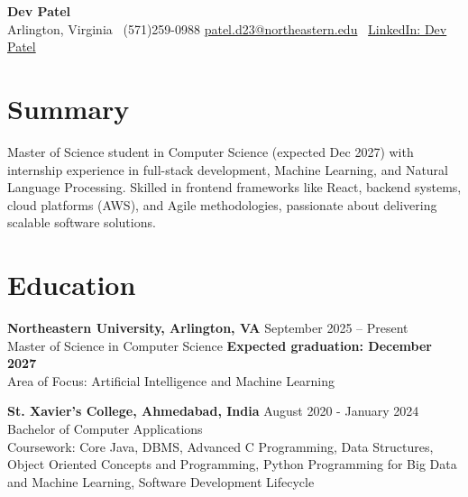 \documentclass[a4paper,10pt]{article}
\begin{document}
\begin{center}
\vspace{-3mm}
    \fontsize{16}{18}\selectfont \textbf{Dev Patel} \\
    \vspace{0mm}
    \normalsize Arlington, Virginia \textbar\ (571)259-0988  \textbar       \href{mailto:patel.d23@northeastern.edu}{patel.d23@northeastern.edu} \textbar\ \href{https://www.linkedin.com/in/devxpatel//}{LinkedIn: Dev Patel} \\
\end{center}



\section*{Summary}
Master of Science student in Computer Science (expected Dec 2027) with internship experience in full-stack development, Machine Learning, and Natural Language Processing. Skilled in frontend frameworks like React, backend systems, cloud platforms (AWS), and Agile methodologies, passionate about delivering scalable software solutions.
 
\vspace{ 0 mm}
\section*{Education}
\textbf{Northeastern University, Arlington, VA} \hfill September 2025 -- Present\\
Master of Science in Computer Science \hfill \textbf{Expected graduation: December 2027} \\
Area of Focus: Artificial Intelligence and Machine Learning

\vspace{1 mm} %
\textbf{St. Xavier's College, Ahmedabad, India} \hfill August 2020 - January 2024 \\
Bachelor of Computer Applications\\
Coursework: Core Java, DBMS, Advanced C Programming, Data Structures, Object Oriented Concepts and Programming, Python Programming for Big Data and Machine Learning, Software Development Lifecycle
\end{document}
